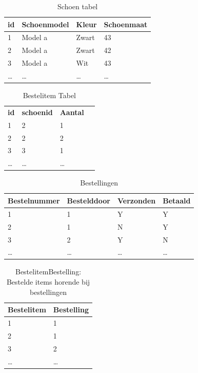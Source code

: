\documentclass{article}
\begin{document}
\begin{table}[htb]
  \centering
  \begin{tabular}{l|l|l|l}
    \textbf{id} & \textbf{Schoenmodel} & \textbf{Kleur} & \textbf{Schoenmaat} \\
    \hline
    1 & Model a              & Zwart          & 43 \\
    2 & Model a              & Zwart          & 42 \\
    3 & Model a              & Wit            & 43 \\
    \ldots & \ldots          & \ldots         & \ldots \\
  \end{tabular}
  \caption{Schoen tabel}
  \label{tab:schoen}
\end{table}

\begin{table}[htb]
  \centering
  \begin{tabular}{l|l|l|l}
    \textbf{id} & \textbf{schoenid} & \textbf{Aantal} \\
    1           & 2                 & 1               \\
    2           & 2                 & 2               \\
    3           & 3                 & 1               \\
    \ldots      & \ldots            & \ldots          \\
  \end{tabular}
  \caption{Bestelitem Tabel}
  \label{tab:bestelitem}
\end{table}

\begin{table}[htb]
  \centering
  \begin{tabular}{l|l|l|l}
    \textbf{Bestelnummer} & \textbf{Bestelddoor} & \textbf{Verzonden} 
    & \textbf{Betaald} \\
    \hline
    1 & 1                &  Y & Y \\
    2 & 1                &  N & Y \\
    3 & 2                & Y  & N \\
    \ldots & \ldots & \ldots & \ldots \\
  \end{tabular}
  \caption{Bestellingen}
  \label{tab:bestellingen}
\end{table}

\begin{table}[htb]
  \centering
  \begin{tabular}{l|l}
    \textbf{Bestelitem} & \textbf{Bestelling}\\ 
    \hline
    1      & 1      \\
    2      & 1      \\
    3      & 2      \\
    \ldots & \ldots \\
  \end{tabular}
  \caption{BestelitemBestelling: Bestelde items horende bij bestellingen}
  \label{tab:bestelitembestelling}
\end{table}
\end{document}
